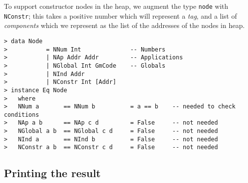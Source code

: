 To support constructor nodes in the heap, we augment the type \mbox{\tt node}
with \mbox{\tt NConstr}; this takes a positive number which will represent a
{\em tag}, and a list of {\em
components} which we represent as the
list of the addresses of the nodes in heap.
\begin{verbatim}
> data Node
>           = NNum Int              -- Numbers
>           | NAp Addr Addr         -- Applications
>           | NGlobal Int GmCode    -- Globals
>           | NInd Addr
>           | NConstr Int [Addr]
> instance Eq Node
>   where
>   NNum a       == NNum b          = a == b    -- needed to check conditions
>   NAp a b      == NAp c d         = False     -- not needed
>   NGlobal a b  == NGlobal c d     = False     -- not needed
>   NInd a       == NInd b          = False     -- not needed
>   NConstr a b  == NConstr c d     = False     -- not needed
\end{verbatim}
%
%
%
%
%
%
\subsection{Printing the result}

